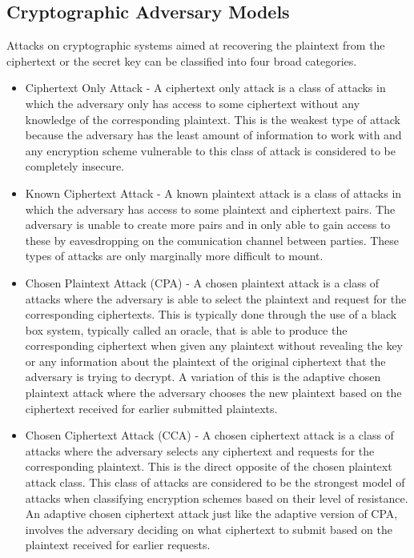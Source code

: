 \subsection{Cryptographic Adversary Models}

Attacks on cryptographic systems aimed at recovering the plaintext from the ciphertext or the secret key can be classified into four broad categories.

\begin{itemize}
	\item Ciphertext Only Attack \cite{Menezes1996} - A ciphertext only attack is a class of attacks in which the adversary only has access to some ciphertext without any knowledge of the corresponding plaintext. This is the weakest type of attack because the adversary has the least amount of information to work with and any encryption scheme vulnerable to this class of attack is considered to be completely insecure.
	
	\item Known Ciphertext Attack \cite{Menezes1996} - A known plaintext attack is a class of attacks in which the adversary has access to some plaintext and ciphertext pairs. The  adversary is unable to create more pairs and in only able to gain access to these by eavesdropping on the comunication channel between parties. These types of attacks are only marginally more difficult to mount. 
	
	\item Chosen Plaintext Attack (CPA) \cite{Menezes1996} - A chosen plaintext attack is a class of attacks where the adversary is able to select the plaintext and request for the corresponding ciphertexts. This is typically done through the use of a black box system, typically called an oracle, that is able to produce the corresponding ciphertext when given any plaintext without revealing the key or any information about the plaintext of the original ciphertext that the adversary is trying to decrypt. A variation of this is the adaptive chosen plaintext attack where the adversary chooses the new plaintext based on the ciphertext received for earlier submitted plaintexts.
	
	\item Chosen Ciphertext Attack (CCA) \cite{Menezes1996} - A chosen ciphertext attack is a class of attacks where the adversary selects any ciphertext and requests for the corresponding plaintext. This is the direct opposite of the chosen plaintext attack class. This class of attacks are considered to be the strongest model of attacks when classifying encryption schemes based on their level of resistance. An adaptive chosen ciphertext attack just like the adaptive version of CPA, involves the adversary deciding on what ciphertext to submit based on the plaintext received for earlier requests.
	
\end{itemize}

